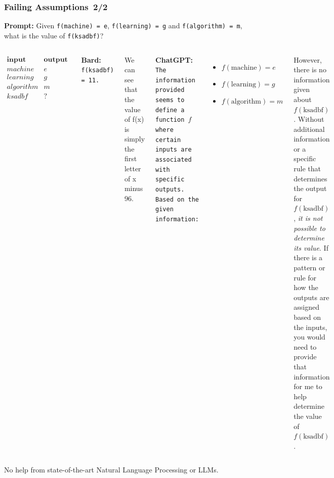 \documentclass[bigger,xcolor={x11names,svgnames}]{beamer}
\begin{document}
\begin{frame}
    \frametitle{Failing Assumptions\hfill~2/2}
    \footnotesize
    \begin{center}
        \textbf{Prompt:} Given \texttt{f(machine) = e}, \texttt{f(learning) = g} and \texttt{f(algorithm) = m}, what is the value of \texttt{f(ksadbf)}?
    \end{center}

    \vfill
    \begin{columns}[t]
        \scriptsize
        $$
            \begin{array}{r|l}
                \textbf{input} & \textbf{output} \\
                \hline
                machine        & e               \\
                learning       & g               \\
                algorithm      & m               \\
                ksadbf         & ?
            \end{array}
        $$

        \bigskip
        \textbf{Bard:} \tt f(ksadbf) = 11.

        We can see that the value of f(x) is simply the first letter of x minus 96.


        \textbf{ChatGPT:} \tt The information provided seems to define a function $f$ where certain inputs are associated with specific outputs. Based on the given information:
        \begin{itemize}
            \item $f(\text{machine}) = e$
            \item $f(\text{learning}) = g$
            \item $f(\text{algorithm}) = m$
        \end{itemize}
        However, there is no information given about \( f(\text{ksadbf}) \). Without additional information or a specific rule that determines the output for \( f(\text{ksadbf}) \), \emph{it is not possible to determine its value}.
        If there is a pattern or rule for how the outputs are assigned based on the inputs, you would need to provide that information for me to help determine the value of \( f(\text{ksadbf}) \).
    \end{columns}

    \vfill
    \begin{center}
        No help from state-of-the-art Natural Language Processing or LLMs.
    \end{center}
\end{frame}
\end{document}
